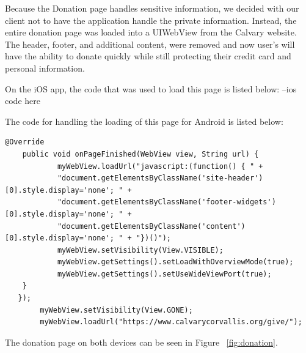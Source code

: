 \documentclass[letterpaper,10pt,draftclsnofoot,onecolumn,titlepage]{IEEEtran}
\begin{document}
		
		Because the Donation page handles sensitive information, we decided with our client not to have the application handle the private information. 
		Instead, the entire donation page was loaded into a UIWebView from the Calvary website. 
		The header, footer, and additional content, were removed and now user's will have the ability to donate quickly while still protecting their credit card and personal information. 
		
		On the iOS app, the code that was used to load this page is listed below: 
		--ios code here
		
		
		The code for handling the loading of this page for Android is listed below:
		\begin{lstlisting}
@Override
    public void onPageFinished(WebView view, String url) {
            myWebView.loadUrl("javascript:(function() { " + 
            "document.getElementsByClassName('site-header')[0].style.display='none'; " + 	   	                      
            "document.getElementsByClassName('footer-widgets')[0].style.display='none'; " + 
            "document.getElementsByClassName('content')[0].style.display='none'; " + "})()");
            myWebView.setVisibility(View.VISIBLE);
            myWebView.getSettings().setLoadWithOverviewMode(true);
            myWebView.getSettings().setUseWideViewPort(true);
   	}
   });
        myWebView.setVisibility(View.GONE);
        myWebView.loadUrl("https://www.calvarycorvallis.org/give/");
        		\end{lstlisting}
		
		The donation page on both devices can be seen in Figure ~\ref{fig:donation}.
		
\end{document}

